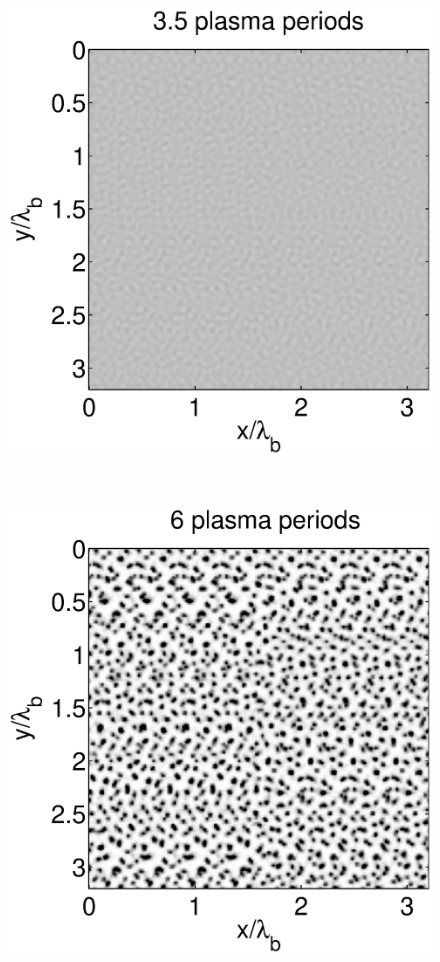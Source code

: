 \documentclass[conference]{IEEEtran}
\renewcommand{\~}{\widetilde }
\begin{document}
\begin{figure}[H]
\begin{center}
\begin{minipage}{0.40\columnwidth}
			\includegraphics[width=1.0\columnwidth]{m3_5_EXP.eps}
	\end{minipage}%
	\\
	\begin{minipage}{0.40\columnwidth}
		\begin{center}
			\includegraphics[width=1.0\columnwidth]{m__6_PIC.eps}

\end{center}
\end{minipage}
\end{center}
\end{figure}
\end{document}
